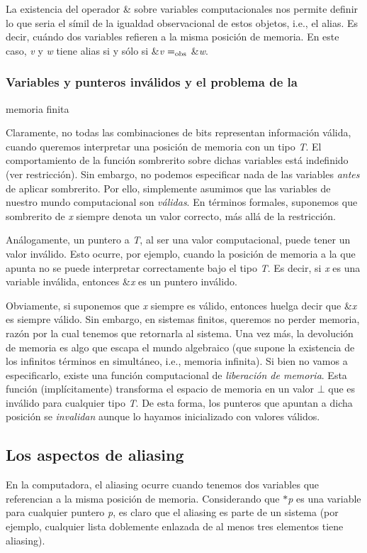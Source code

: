 La existencia del operador \& sobre variables computacionales nos permite definir lo que seria el símil de la igualdad observacional de estos objetos, i.\-e., el alias. Es decir, cuándo dos variables refieren a la misma posición de memoria. En este caso, {\itshape v} y {\itshape w} tiene alias si y sólo si \&{\itshape v} $=_{\rm obs}$ \&{\itshape w}.\hypertarget{Aliasing_sec-invalido}{}\subsubsection{Variables y punteros inválidos y el problema de la}\label{Aliasing_sec-invalido}
memoria finita

Claramente, no todas las combinaciones de bits representan información válida, cuando queremos interpretar una posición de memoria con un tipo {\itshape T}. El comportamiento de la función sombrerito sobre dichas variables está indefinido (ver restricción). Sin embargo, no podemos especificar nada de las variables {\itshape antes} de aplicar sombrerito. Por ello, simplemente asumimos que las variables de nuestro mundo computacional son {\itshape válidas}. En términos formales, suponemos que sombrerito de {\itshape x} siempre denota un valor correcto, más allá de la restricción.

Análogamente, un puntero a {\itshape T}, al ser una valor computacional, puede tener un valor inválido. Esto ocurre, por ejemplo, cuando la posición de memoria a la que apunta no se puede interpretar correctamente bajo el tipo {\itshape T}. Es decir, si {\itshape x} es una variable inválida, entonces \&{\itshape x} es un puntero inválido.

Obviamente, si suponemos que {\itshape x} siempre es válido, entonces huelga decir que \&{\itshape x} es siempre válido. Sin embargo, en sistemas finitos, queremos no perder memoria, razón por la cual tenemos que retornarla al sistema. Una vez más, la devolución de memoria es algo que escapa el mundo algebraico (que supone la existencia de los infinitos términos en simultáneo, i.\-e., memoria infinita). Si bien no vamos a especificarlo, existe una función computacional de {\itshape liberación de memoria}. Esta función (implícitamente) transforma el espacio de memoria en un valor $\bot$ que es inválido para cualquier tipo {\itshape T}. De esta forma, los punteros que apuntan a dicha posición se {\itshape invalidan} aunque lo hayamos inicializado con valores válidos.\hypertarget{Aliasing_sec-aliasing}{}\subsection{Los aspectos de aliasing}\label{Aliasing_sec-aliasing}
En la computadora, el aliasing ocurre cuando tenemos dos variables que referencian a la misma posición de memoria. Considerando que $\ast${\itshape p} es una variable para cualquier puntero {\itshape p}, es claro que el aliasing es parte de un sistema (por ejemplo, cualquier lista doblemente enlazada de al menos tres elementos tiene aliasing).

